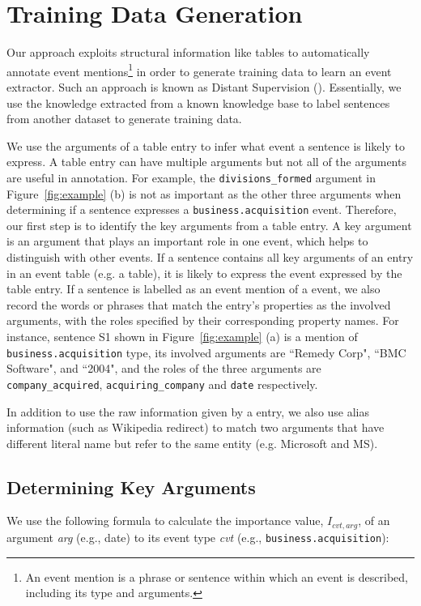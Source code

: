 \section{Training Data Generation}
Our approach exploits structural information like \FB \CVT tables to  automatically annotate event mentions\footnote{An event mention is a
phrase or sentence within which an event is described, including its type and arguments.} in order to generate training data to learn an
event extractor. Such an approach is known as Distant Supervision (\DS)\FIXME{~\cite{}}. Essentially, we use the knowledge extracted from a
known knowledge base to label sentences from another dataset to generate training data.


We use the arguments of a \CVT table entry to infer what event a sentence is likely to express. A \CVT table entry can have multiple
arguments but not all of the arguments are useful in annotation. For example, the \texttt{divisions\_formed} argument in
Figure~\ref{fig:example} (b) is not as important as the other three arguments when determining if a sentence expresses a
\texttt{business.acquisition} event. Therefore, our first step is to identify the key arguments from a \CVT table entry. A key argument is
an argument that plays an important role in one event, which helps to distinguish with other events. If a sentence contains all key
arguments of an entry in an event table (e.g. a \CVT table), it is likely to express the event expressed by the table entry. If a sentence
is labelled as an event mention of a \CVT event, we also record the words or phrases that match the entry’s properties as the involved
arguments, with the roles specified by their corresponding property names. For instance, sentence S1 shown in Figure~\ref{fig:example} (a)
is a mention of \texttt{business.acquisition} type, its involved arguments are ``Remedy Corp", ``BMC Software", and ``2004", and the roles
of the three arguments are \texttt{company\_acquired}, \texttt{acquiring\_company} and \texttt{date} respectively.

In addition to use the raw information given by a \CVT entry, we also use alias information (such as Wikipedia redirect) to match two
arguments that have different literal name but refer to the same entity (e.g. Microsoft and MS).

\subsection{Determining Key Arguments}
We use the following formula to calculate the importance value, $I_{cvt, arg}$, of an argument \emph{arg} (e.g., date) to its event type
\emph{cvt} (e.g., \texttt{business.acquisition}):

